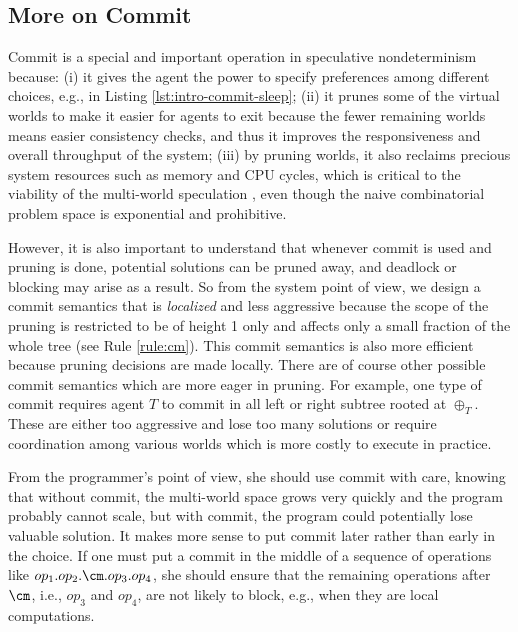 \subsection{More on Commit}\label{sec:commit}
Commit is a special and important operation in speculative nondeterminism because:
(i) it gives the agent the power to specify preferences among different choices,
e.g., in Listing \ref{lst:intro-commit-sleep}; 
(ii) it prunes some of the virtual worlds to make it easier for agents to exit
because the fewer remaining worlds means easier consistency checks,
and thus it improves the responsiveness and overall throughput of the system;
(iii) by pruning worlds, it also reclaims precious system resources such as
memory and CPU cycles, which is critical to the viability of the multi-world 
speculation , even though the naive combinatorial problem space is exponential and
prohibitive.

However, it is also important to understand that whenever commit is used and
pruning is done, potential solutions can be pruned away, and deadlock or blocking
may arise as a result. So from the system point of view, we design a commit
semantics that is {\em localized} and less aggressive because the scope of the pruning
is restricted to be of height 1 only and affects only a small fraction of
the whole tree (see Rule \ref{rule:cm}). This commit semantics is also
more efficient because pruning decisions are made locally. There are of course
other possible commit semantics \cite{JaffarYZ07} which are more eager in pruning. 
For example, one type of commit requires agent $T$ to commit in all left or right
subtree rooted at $\oplus_T$. These are either too aggressive and lose 
too many solutions or require coordination
among various worlds which is more costly to execute in practice.

From the programmer's point of view, she should use commit with care, knowing that
without commit, the multi-world space grows very quickly and the program probably
cannot scale, but with commit, the program could potentially lose valuable solution.
It makes more sense to put commit later rather than early in the choice. 
If one must put a commit in the middle of a sequence of operations like
$op_1.op_2.\cm.op_3.op_4$, she should ensure that the remaining operations
after $\cm$, i.e., $op_3$ and $op_4$, are not likely to block, 
e.g., when they are local computations.

%

